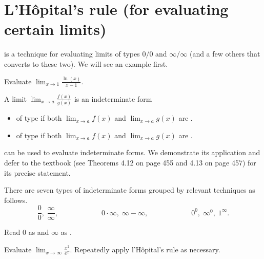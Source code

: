 \documentclass[../main.tex]{subfiles}
\begin{document}
 \section{L'H\^opital's rule (for evaluating certain limits)}
 is a technique for evaluating limits of types \(0/0\) and \(\infty/\infty\) (and a few others that converts to these two). We will see an example first.

\begin{example}
  Evaluate \(\lim_{x \to 1} \frac{\ln(x)}{x - 1}\).

\end{example}

A limit \(\lim_{x \to a} \frac{f(x)}{g(x)}\) is an indeterminate form
\begin{itemize}
  \item of type \underline{\hspace{1in}} if both \(\lim_{x \to a} f(x)\) and \(\lim_{x \to a} g(x)\) are \underline{\hspace{1in}}.
  \item of type \underline{\hspace{1in}} if both \(\lim_{x \to a} f(x)\) and \(\lim_{x \to a} g(x)\) are \underline{\hspace{1in}}.
\end{itemize}
 can be used to evaluate indeterminate forms. We demonstrate its application and defer to the textbook (see Theorems 4.12 on page 455 and 4.13 on page 457) for its precise statement.

\faStar{} There are seven types of indeterminate forms grouped by relevant techniques as follows.
\[
  \frac{0}{0},\; \frac{\infty}{\infty}, \hspace{1in} 0 \cdot \infty,\; \infty - \infty, \hspace{1in} 0^{0}, \; \infty^{0}, \; 1^{\infty}.
\]


Read \(0\) as \underline{\hspace{2in}} and \(\infty\) as \underline{\hspace{2in}}.

\begin{exercise}
  Evaluate \(\lim_{x \to \infty} \frac{x^{2}}{e^{x}}\).  \hfill {\footnotesize Repeatedly apply l'H\^opital's rule as necessary.}

  \blanks*
\end{exercise}

\clearpage
\end{document}
